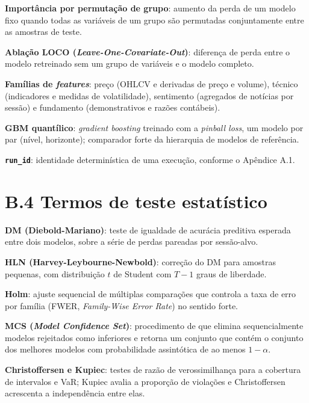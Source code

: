 \label{gl:permutacao}\textbf{Importância por permutação de grupo}: aumento da perda de um modelo fixo quando todas as variáveis de um grupo são permutadas conjuntamente entre as amostras de teste.

\label{gl:loco}\textbf{Ablação LOCO (\textit{Leave-One-Covariate-Out})}: diferença de perda entre o modelo retreinado sem um grupo de variáveis e o modelo completo.

\label{gl:feature-families}\textbf{Famílias de \textit{features}}: preço (OHLCV e derivadas de preço e volume), técnico (indicadores e medidas de volatilidade), sentimento (agregados de notícias por sessão) e fundamento (demonstrativos e razões contábeis).

\label{gl:gbm}\textbf{GBM quantílico}: \textit{gradient boosting} treinado com a \textit{pinball loss}, um modelo por par (nível, horizonte); comparador forte da hierarquia de modelos de referência.

\label{gl:run-id}\textbf{\texttt{run\_id}}: identidade determinística de uma execução, conforme o Apêndice A.1.

\section*{B.4 Termos de teste estatístico}

\label{gl:dm}\textbf{DM (Diebold-Mariano)}: teste de igualdade de acurácia preditiva esperada entre dois modelos, sobre a série de perdas pareadas por sessão-alvo.

\label{gl:hln}\textbf{HLN (Harvey-Leybourne-Newbold)}: correção do DM para amostras pequenas, com distribuição \(t\) de Student com \(T-1\) graus de liberdade.

\label{gl:holm}\textbf{Holm}: ajuste sequencial de múltiplas comparações que controla a taxa de erro por família (FWER, \textit{Family-Wise Error Rate}) no sentido forte.

\label{gl:mcs}\textbf{MCS (\textit{Model Confidence Set})}: procedimento de  que elimina sequencialmente modelos rejeitados como inferiores e retorna um conjunto que contém o conjunto dos melhores modelos com probabilidade assintótica de ao menos \(1-\alpha\).

\label{gl:christoffersen}\textbf{Christoffersen e Kupiec}: testes de razão de verossimilhança para a cobertura de intervalos e VaR; Kupiec avalia a proporção de violações e Christoffersen acrescenta a independência entre elas.

